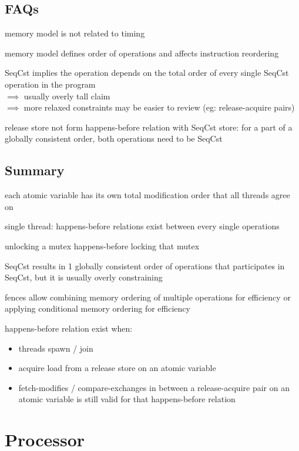 \documentclass[8pt]{extarticle}
\begin{document}
\begin{multicols*}{2}
    \subsection{FAQs}

    memory model is not related to timing

    memory model defines order of operations and affects instruction reordering

    SeqCst implies the operation depends on the total order of every single SeqCst operation in the program\\
    $\implies$ usually overly tall claim\\
    $\implies$ more relaxed constraints may be easier to review (eg: release-acquire pairs)

    release store not form happens-before relation with SeqCst store: for a part of a globally consistent order, both operations need to be SeqCst

    \subsection{Summary}

    each atomic variable has its own total modification order that all threads agree on

    single thread: happens-before relations exist between every single operations

    unlocking a mutex happens-before locking that mutex

    SeqCst results in 1 globally consistent order of operations that participates in SeqCst, but it is usually overly constraining

    fences allow combining memory ordering of multiple operations for efficiency or applying conditional memory ordering for efficiency

    happens-before relation exist when:
    \begin{itemize}
    \item threads spawn / join
    \item acquire load from a release store on an atomic variable
    \item fetch-modifies / compare-exchanges in between a release-acquire pair on an atomic variable is still valid for that happens-before relation
    \end{itemize}

    \vfill\null
    \columnbreak

    \section{Processor}


\end{multicols*}
\end{document}
